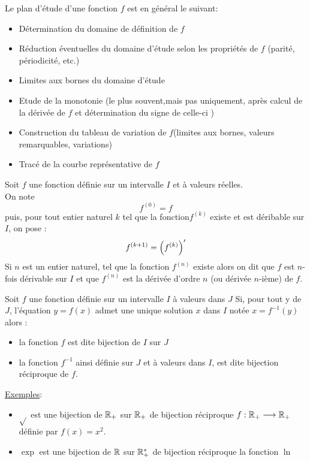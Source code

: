 \begin{defprop}
	Le plan d'étude d'une fonction \(f\) est en général le suivant:
	\begin{itemize}
		\item Détermination du domaine de définition de \(f\)
		\item Réduction éventuelles du domaine d'étude selon les propriétés de \(f\) (parité, périodicité, etc.)
		\item Limites aux bornes du domaine d'étude
		\item Etude de la monotonie (le plus souvent,mais pas uniquement, après calcul de la dérivée de \(f\) et détermination du signe de celle-ci )
		\item Construction du tableau de variation de \(f\)(limites aux bornes, valeurs remarquables, variations)
		\item Tracé de la courbe représentative de \(f\)
	\end{itemize}
\end{defprop}
\begin{defprop}
	Soit \(f\) une fonction définie sur un intervalle \(I\) et à valeurs réelles. \\
	On note
	\[f^{(0)} = f\]
	puis, pour tout entier naturel \(k\) tel que la fonction\(f^{(k)}\) existe et est déribable sur \(I\), on pose :
	\[f^{(k+1)} = \left(f^{(k)}\right)'\]
	Si \(n\) est un entier naturel, tel que la fonction \(f^{(n)}\) existe alors on dit que \(f\) est \(n\)-fois dérivable sur \(I\) et que \(f^{(n)}\) est la dérivée d'ordre \(n\) (ou dérivée \(n\)-ième) de \(f\).\\

\end{defprop}
\begin{defi}
	Soit \(f\) une fonction définie sur un intervalle \(I\) à valeurs dans \(J\)
	Si, pour tout y de \(J\), l’équation \(y = f(x)\) admet une unique solution \(x\) dans \(I\) notée \(x = f^{-1}(y)\) alors :
	\begin{itemize}
		\item la fonction \(f\) est dite bijection de \(I\) sur \(J\)
		\item la fonction \(f^{-1}\) ainsi définie sur \(J\) et à valeurs dans \(I\), est dite bijection réciproque de \(f\).
	\end{itemize}
	\underline{Exemples}:
	\begin{itemize}
		\item \(\sqrt{}\) est une bijection de \(\mathbb{R}_+\) sur \(\mathbb{R}_+\) de bijection réciproque \(f : \mathbb{R}_+ \longrightarrow \mathbb{R}_+\) définie par \(f(x) = x^2\).
		\item \(\exp\) est une bijection de \(\mathbb{R}\) sur \(\mathbb{R}_+^*\) de bijection réciproque la fonction \(\ln\)
	\end{itemize}
\end{defi}
